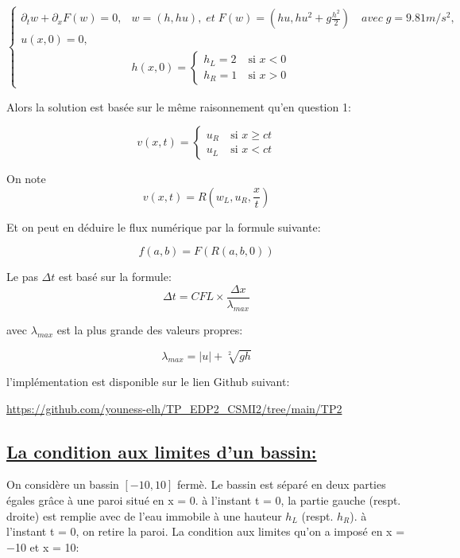 \begin{equation}
\label{systeme}
\left \lbrace \begin{array}{rl}
\partial_t w +  \partial_x F(w)= 0, & w = (h, hu), \; et \; F(w) = (h u,h u^2 + g \frac{h^2}{2}) \quad avec \; g = 9.81 m/s^2,  \\
u(x,0) = 0,  \\
& h(x,0) =
\left \lbrace \begin{array}{rl}
h_L = 2 & ~\text{si }  x < 0\\
h_R = 1 & ~\text{si }  x > 0
\end{array}\right.
\end{array}\right.
\end{equation}


Alors la solution est bas\'ee sur le m\^eme raisonnement qu'en question 1:

\begin{equation}
\label{R}
v(x,t)=
\left \lbrace \begin{array}{rl}
u_R & ~\text{si }  x\geq ct\\
u_L & ~\text{si }  x<ct
\end{array}\right.
\end{equation}

On note $$v(x,t) = R(w_L,u_R,\frac {x}{t})$$

Et on peut en d\'eduire le flux num\'erique par la formule suivante:

$$f(a,b) = F(R(a,b,0))$$

Le pas $\Delta t$ est bas\'e sur la formule:
$$\Delta t = CFL \times \frac{\Delta x}{\lambda_{max}}$$

avec $\lambda_{max}$ est la plus grande des valeurs propres:

$$\lambda_{max} = |u| + \sqrt[2]{g h}$$

l'impl\'ementation est disponible sur le lien Github suivant:

\url{https://github.com/youness-elh/TP_EDP2_CSMI2/tree/main/TP2}



\subsection[La condition aux limites d'un bassin]{\uline{La condition aux limites d'un bassin:}}

On consid\`ere un bassin $[−10, 10]$ ferm\`e. Le bassin est s\'epar\'e en deux parties \'egales gr\^ace \`a une paroi situ\'e en x = 0. \`a
l’instant t = 0, la partie gauche (respt. droite) est remplie avec de l’eau immobile à une hauteur $h_L$ (respt. $h_R$). \`a l’instant
t = 0, on retire la paroi. 
La condition aux limites qu'on a impos\'e en x = −10 et x = 10:

